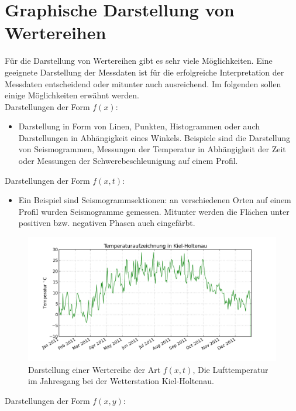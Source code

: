 \newpage


\section{Graphische Darstellung von Wertereihen}
Für die Darstellung von Wertereihen gibt es sehr viele Möglichkeiten. Eine geeignete Darstellung der Messdaten ist für die erfolgreiche Interpretation der Messdaten entscheidend oder mitunter auch ausreichend. Im folgenden sollen einige Möglichkeiten erwähnt werden.\\[.5cm]
Darstellungen der Form $f(x)$:
\begin{itemize}
    \item Darstellung in Form von Linen, Punkten, Histogrammen oder auch Darstellungen in Abhängigkeit eines Winkels. Beispiele sind die Darstellung von Seismogrammen, Messungen der Temperatur in Abhängigkeit der Zeit oder Messungen der Schwerebeschleunigung auf einem Profil. 
  \end{itemize}
  Darstellungen der Form  $f(x,t)$: 
\begin{itemize}
\item
Ein Beispiel sind Seismogrammsektionen: an verschiedenen Orten auf einem Profil wurden Seismogramme gemessen. Mitunter werden die Flächen unter positiven bzw. negativen Phasen auch eingefärbt.
\end{itemize}
  \begin{figure}[h!]
  \centering
  \includegraphics[width=.9\tw]{fig/01-Einleitung/temperature-diagram_kiel.png}
  \caption{Darstellung einer Wertereihe der Art $f(x, t)$, Die Lufttemperatur im Jahresgang bei der Wetterstation Kiel-Holtenau.}
  \end{figure}
Darstellungen der Form $f(x,y)$:
